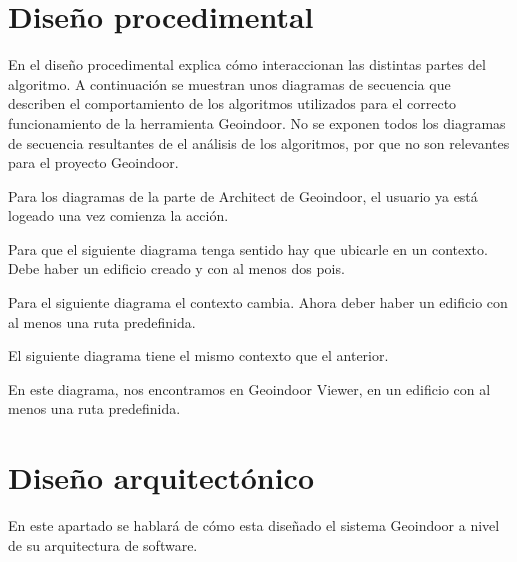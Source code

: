 \section{Diseño procedimental}

En el diseño procedimental explica cómo interaccionan las distintas partes del algoritmo.
A continuación se muestran unos diagramas de secuencia que describen el comportamiento de los algoritmos utilizados para el correcto funcionamiento de la herramienta Geoindoor. No se exponen todos los diagramas de secuencia resultantes de el análisis de los algoritmos, por que no son relevantes para el proyecto Geoindoor.

Para los diagramas de la parte de Architect de Geoindoor, el usuario ya está logeado una vez comienza la acción.
\newpage
{}

Para que el siguiente diagrama tenga sentido hay que ubicarle en un contexto. Debe haber un edificio creado y con al menos dos pois.
\newpage
{}

Para el siguiente diagrama el contexto cambia. Ahora deber haber un edificio con al menos una ruta predefinida.


\newpage
El siguiente diagrama tiene el mismo contexto que el anterior.


\newpage
En este diagrama, nos encontramos en Geoindoor Viewer, en un edificio con al menos una ruta predefinida.

 
\section{Diseño arquitectónico}

En este apartado se hablará de cómo esta diseñado el sistema Geoindoor a nivel de su arquitectura de software.

